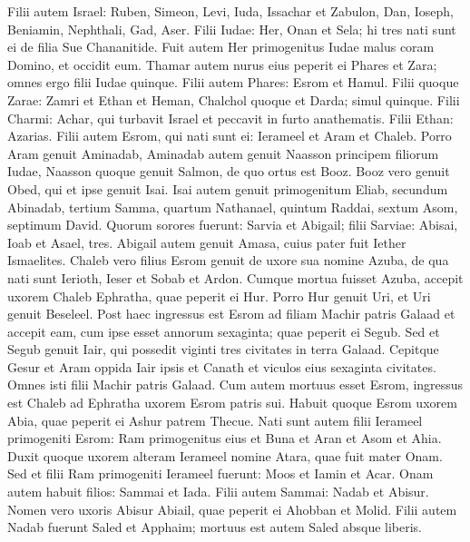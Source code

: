 \begin{biblechapter}  
\verse Filii autem Israel: Ruben, Simeon, Levi, Iuda, Issachar et Zabulon, 
\verse Dan, Ioseph, Beniamin, Nephthali, Gad, Aser. 
\verse Filii Iudae: Her, Onan et Sela; hi tres nati sunt ei de filia Sue Chananitide. Fuit autem Her primogenitus Iudae malus coram Domino, et occidit eum. 
\verse Thamar autem nurus eius peperit ei Phares et Zara; omnes ergo filii Iudae quinque. 
\verse Filii autem Phares: Esrom et Hamul. 
\verse Filii quoque Zarae: Zamri et Ethan et Heman, Chalchol quoque et Darda; simul quinque. 
\verse Filii Charmi: Achar, qui turbavit Israel et peccavit in furto anathematis. 
\verse Filii Ethan: Azarias. 
\verse Filii autem Esrom, qui nati sunt ei: Ierameel et Aram et Chaleb. 
\verse Porro Aram genuit Aminadab, Aminadab autem genuit Naasson principem filiorum Iudae, 
\verse Naasson quoque genuit Salmon, de quo ortus est Booz. 
\verse Booz vero genuit Obed, qui et ipse genuit Isai. 
\verse Isai autem genuit primogenitum Eliab, secundum Abinadab, tertium Samma, 
\verse quartum Nathanael, quintum Raddai, 
\verse sextum Asom, septimum David. 
\verse Quorum sorores fuerunt: Sarvia et Abigail; filii Sarviae: Abisai, Ioab et Asael, tres. 
\verse Abigail autem genuit Amasa, cuius pater fuit Iether Ismaelites. 
\verse Chaleb vero filius Esrom genuit de uxore sua nomine Azuba, de qua nati sunt Ierioth, Ieser et Sobab et Ardon. 
\verse Cumque mortua fuisset Azuba, accepit uxorem Chaleb Ephratha, quae peperit ei Hur. 
\verse Porro Hur genuit Uri, et Uri genuit Beseleel. 
\verse Post haec ingressus est Esrom ad filiam Machir patris Galaad et accepit eam, cum ipse esset annorum sexaginta; quae peperit ei Segub.  
\verse Sed et Segub genuit Iair, qui possedit viginti tres civitates in terra Galaad. 
\verse Cepitque Gesur et Aram oppida Iair ipsis et Canath et viculos eius sexaginta civitates. Omnes isti filii Machir patris Galaad. 
\verse Cum autem mortuus esset Esrom, ingressus est Chaleb ad Ephratha uxorem Esrom patris sui. Habuit quoque Esrom uxorem Abia, quae peperit ei Ashur patrem Thecue. 
\verse Nati sunt autem filii Ierameel primogeniti Esrom: Ram primogenitus eius et Buna et Aran et Asom et Ahia. 
\verse Duxit quoque uxorem alteram Ierameel nomine Atara, quae fuit mater Onam. 
\verse Sed et filii Ram primogeniti Ierameel fuerunt: Moos et Iamin et Acar. 
\verse Onam autem habuit filios: Sammai et Iada. Filii autem Sammai: Nadab et Abisur. 
\verse Nomen vero uxoris Abisur Abiail, quae peperit ei Ahobban et Molid. 
\verse Filii autem Nadab fuerunt Saled et Apphaim; mortuus est autem Saled absque liberis. 

\end{biblechapter}
